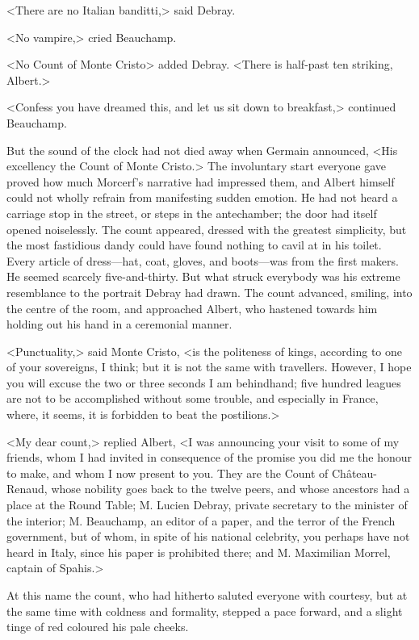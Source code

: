  <There are no Italian banditti,> said Debray. 

 <No vampire,> cried Beauchamp. 

 <No Count of Monte Cristo> added Debray. <There is half-past ten striking, Albert.>

<Confess you have dreamed this, and let us sit down to breakfast,> continued Beauchamp. 

 But the sound of the clock had not died away when Germain announced, <His excellency the Count of Monte Cristo.> The involuntary start everyone gave proved how much Morcerf's narrative had impressed them, and Albert himself could not wholly refrain from manifesting sudden emotion. He had not heard a carriage stop in the street, or steps in the antechamber; the door had itself opened noiselessly. The count appeared, dressed with the greatest simplicity, but the most fastidious dandy could have found nothing to cavil at in his toilet. Every article of dress—hat, coat, gloves, and boots—was from the first makers. He seemed scarcely five-and-thirty. But what struck everybody was his extreme resemblance to the portrait Debray had drawn. The count advanced, smiling, into the centre of the room, and approached Albert, who hastened towards him holding out his hand in a ceremonial manner. 

 <Punctuality,> said Monte Cristo, <is the politeness of kings, according to one of your sovereigns, I think; but it is not the same with travellers. However, I hope you will excuse the two or three seconds I am behindhand; five hundred leagues are not to be accomplished without some trouble, and especially in France, where, it seems, it is forbidden to beat the postilions.> 

 <My dear count,> replied Albert, <I was announcing your visit to some of my friends, whom I had invited in consequence of the promise you did me the honour to make, and whom I now present to you. They are the Count of Château-Renaud, whose nobility goes back to the twelve peers, and whose ancestors had a place at the Round Table; M. Lucien Debray, private secretary to the minister of the interior; M. Beauchamp, an editor of a paper, and the terror of the French government, but of whom, in spite of his national celebrity, you perhaps have not heard in Italy, since his paper is prohibited there; and M. Maximilian Morrel, captain of Spahis.> 

 At this name the count, who had hitherto saluted everyone with courtesy, but at the same time with coldness and formality, stepped a pace forward, and a slight tinge of red coloured his pale cheeks. 

